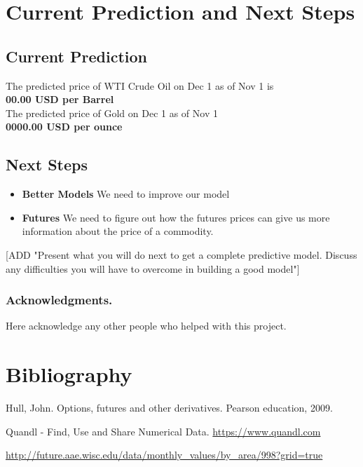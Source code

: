 \documentclass[runningheads]{llncs}
\begin{document}
\newpage
\section{Current Prediction and Next Steps}

\subsection {Current Prediction}
\noindent The predicted price of WTI Crude Oil on Dec 1 as of Nov 1 is \\
\textbf{00.00 USD per Barrel} \\

\noindent The predicted price of Gold on Dec 1 as of Nov 1 \\
\textbf{0000.00 USD per ounce} \\

\subsection {Next Steps}

\begin{itemize}
\item \textbf{Better Models} We need to improve our model  
\item \textbf{Futures} We need to figure out how the futures prices can give us more information about the price of a commodity.
 
\end{itemize}

[ADD "Present what you will do next to get a complete predictive model.  Discuss any difficulties you will have to overcome in building a good model"]

\subsubsection*{Acknowledgments.} Here acknowledge any other people who helped with this project.

\section{Bibliography}\label{references}

\begin{thebibliography}{4}

 Hull, John. Options, futures and other derivatives. Pearson education, 2009.

 Quandl - Find, Use and Share Numerical Data. \url{https://www.quandl.com}

\url{http://future.aae.wisc.edu/data/monthly_values/by_area/998?grid=true}

\end{thebibliography}
\end{document}
